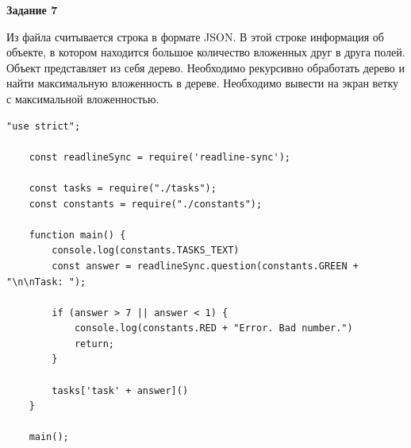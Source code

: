 \textbf{Задание 7}

Из файла считывается строка в формате JSON. В этой строке информация об объекте, в котором находится большое количество вложенных друг в друга полей. Объект представляет из себя дерево. Необходимо рекурсивно обработать дерево и найти максимальную вложенность в дереве. Необходимо вывести на экран ветку с максимальной вложенностью.


\begin{lstlisting}[caption=Код программы. TASK\_1. Главнвая функция main]
	"use strict";

	const readlineSync = require('readline-sync');
	
	const tasks = require("./tasks");
	const constants = require("./constants");
	
	function main() {
		console.log(constants.TASKS_TEXT)
		const answer = readlineSync.question(constants.GREEN + "\n\nTask: ");
	
		if (answer > 7 || answer < 1) {
			console.log(constants.RED + "Error. Bad number.")
			return;
		}
	
		tasks['task' + answer]()
	}
	
	main();
\end{lstlisting}

